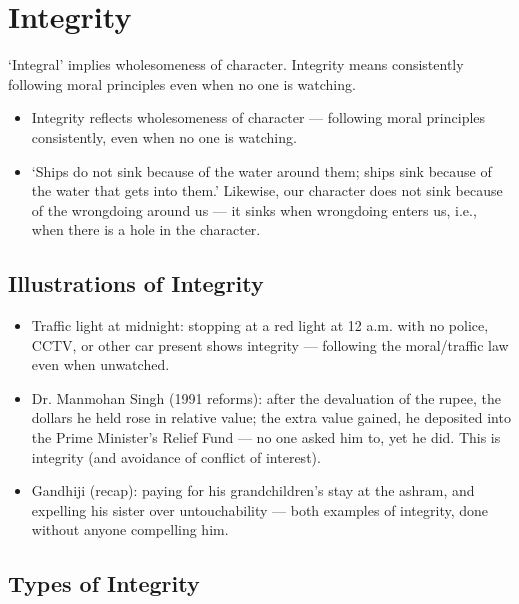 \section{Integrity}

`Integral' implies wholesomeness of character. Integrity means consistently following moral principles even when no one is watching.

\begin{KeyConcept}
\begin{itemize}
\item Integrity reflects wholesomeness of character --- following moral principles consistently, even when no one is watching.
\item `Ships do not sink because of the water around them; ships sink because of the water that gets into them.' Likewise, our character does not sink because of the wrongdoing around us --- it sinks when wrongdoing enters us, i.e., when there is a hole in the character.
\end{itemize}
\end{KeyConcept}

\subsection{Illustrations of Integrity}

\begin{itemize}
\item Traffic light at midnight: stopping at a red light at 12 a.m. with no police, CCTV, or other car present shows integrity --- following the moral/traffic law even when unwatched.
\item Dr. Manmohan Singh (1991 reforms): after the devaluation of the rupee, the dollars he held rose in relative value; the extra value gained, he deposited into the Prime Minister's Relief Fund --- no one asked him to, yet he did. This is integrity (and avoidance of conflict of interest).
\item Gandhiji (recap): paying for his grandchildren's stay at the ashram, and expelling his sister over untouchability --- both examples of integrity, done without anyone compelling him.
\end{itemize}

\subsection{Types of Integrity}

